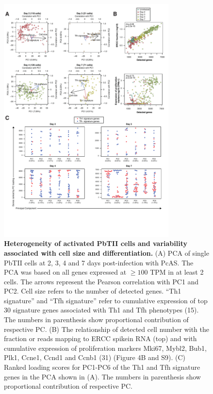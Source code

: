 \begin{figure}
    \centering
    \includegraphics[width=0.8\textwidth]{"Fig S5 rev3"}
    \caption[Heterogeneity of activated PbTII cells and variability associated with cell size and differentiation]{\textbf{Heterogeneity of activated PbTII cells and variability associated with cell size and differentiation.} (A) PCA of single PbTII cells at 2, 3, 4 and 7 days post-infection with PcAS. The PCA was based on all genes expressed at \( \geq 100 \) TPM in at least 2 cells. The arrows represent the Pearson correlation with PC1 and PC2. Cell size refers to the number of detected genes. “Th1 signature” and “Tfh signature” refer to cumulative expression of top 30 signature genes associated with Th1 and Tfh phenotypes (15). The numbers in parenthesis show proportional contribution of respective PC. (B) The relationship of detected cell number with the fraction or reads mapping to ERCC spikein RNA (top) and with cumulative expression of proliferation markers Mki67, Mybl2, Bub1, Plk1, Ccne1, Ccnd1 and Ccnb1 (31) (Figure 4B and S9). (C) Ranked loading scores for PC1-PC6 of the Th1 and Tfh signature genes in the PCA shown in (A). The numbers in parenthesis show proportional contribution of respective PC.}
    \label{fig:ms5}
\end{figure}

